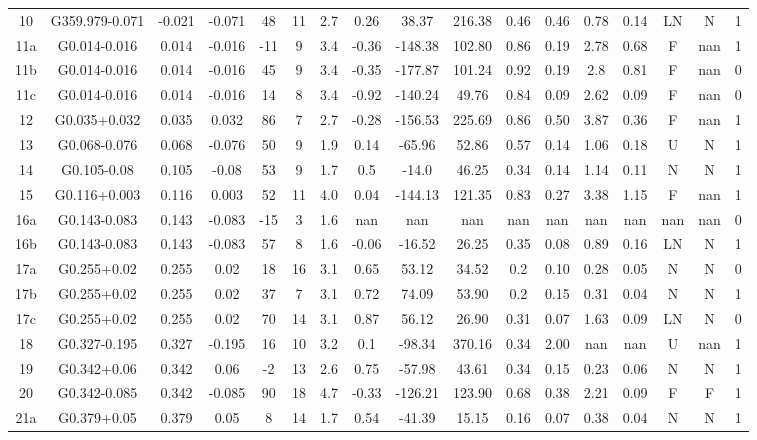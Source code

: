 \begin{table}
\begin{tabular}{ccccccccccccccccc}
10 & G359.979-0.071 & -0.021 & -0.071 & 48 & 11 & 2.7 & 0.26 & 38.37 & 216.38 & 0.46 & 0.46 & 0.78 & 0.14 & LN & N & 1 \\
11a & G0.014-0.016 & 0.014 & -0.016 & -11 & 9 & 3.4 & -0.36 & -148.38 & 102.80 & 0.86 & 0.19 & 2.78 & 0.68 & F & nan & 1 \\
11b & G0.014-0.016 & 0.014 & -0.016 & 45 & 9 & 3.4 & -0.35 & -177.87 & 101.24 & 0.92 & 0.19 & 2.8 & 0.81 & F & nan & 0 \\
11c & G0.014-0.016 & 0.014 & -0.016 & 14 & 8 & 3.4 & -0.92 & -140.24 & 49.76 & 0.84 & 0.09 & 2.62 & 0.09 & F & nan & 0 \\
12 & G0.035+0.032 & 0.035 & 0.032 & 86 & 7 & 2.7 & -0.28 & -156.53 & 225.69 & 0.86 & 0.50 & 3.87 & 0.36 & F & nan & 1 \\
13 & G0.068-0.076 & 0.068 & -0.076 & 50 & 9 & 1.9 & 0.14 & -65.96 & 52.86 & 0.57 & 0.14 & 1.06 & 0.18 & U & N & 1 \\
14 & G0.105-0.08 & 0.105 & -0.08 & 53 & 9 & 1.7 & 0.5 & -14.0 & 46.25 & 0.34 & 0.14 & 1.14 & 0.11 & N & N & 1 \\
15 & G0.116+0.003 & 0.116 & 0.003 & 52 & 11 & 4.0 & 0.04 & -144.13 & 121.35 & 0.83 & 0.27 & 3.38 & 1.15 & F & nan & 1 \\
16a & G0.143-0.083 & 0.143 & -0.083 & -15 & 3 & 1.6 & nan & nan & nan & nan & nan & nan & nan & nan & nan & 0 \\
16b & G0.143-0.083 & 0.143 & -0.083 & 57 & 8 & 1.6 & -0.06 & -16.52 & 26.25 & 0.35 & 0.08 & 0.89 & 0.16 & LN & N & 1 \\
17a & G0.255+0.02 & 0.255 & 0.02 & 18 & 16 & 3.1 & 0.65 & 53.12 & 34.52 & 0.2 & 0.10 & 0.28 & 0.05 & N & N & 0 \\
17b & G0.255+0.02 & 0.255 & 0.02 & 37 & 7 & 3.1 & 0.72 & 74.09 & 53.90 & 0.2 & 0.15 & 0.31 & 0.04 & N & N & 1 \\
17c & G0.255+0.02 & 0.255 & 0.02 & 70 & 14 & 3.1 & 0.87 & 56.12 & 26.90 & 0.31 & 0.07 & 1.63 & 0.09 & LN & N & 0 \\
18 & G0.327-0.195 & 0.327 & -0.195 & 16 & 10 & 3.2 & 0.1 & -98.34 & 370.16 & 0.34 & 2.00 & nan & nan & U & nan & 1 \\
19 & G0.342+0.06 & 0.342 & 0.06 & -2 & 13 & 2.6 & 0.75 & -57.98 & 43.61 & 0.34 & 0.15 & 0.23 & 0.06 & N & N & 1 \\
20 & G0.342-0.085 & 0.342 & -0.085 & 90 & 18 & 4.7 & -0.33 & -126.21 & 123.90 & 0.68 & 0.38 & 2.21 & 0.09 & F & F & 1 \\
21a & G0.379+0.05 & 0.379 & 0.05 & 8 & 14 & 1.7 & 0.54 & -41.39 & 15.15 & 0.16 & 0.07 & 0.38 & 0.04 & N & N & 1 \\

\end{tabular}
\end{table}
